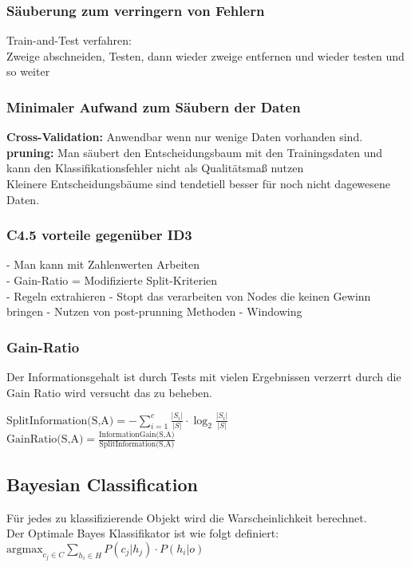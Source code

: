 \documentclass[a4paper]{scrartcl}
\begin{document}
\subsubsection{Säuberung zum verringern von Fehlern}
Train-and-Test verfahren:\\
 Zweige abschneiden, Testen, dann wieder zweige entfernen und wieder testen und so weiter\\
 
\subsubsection{Minimaler Aufwand zum Säubern der Daten}
\textbf{Cross-Validation:} Anwendbar wenn nur wenige Daten vorhanden sind. \\
\textbf{pruning:} Man säubert den Entscheidungsbaum mit den Trainingsdaten und kann den Klassifikationsfehler nicht als Qualitätsmaß nutzen\\

Kleinere Entscheidungsbäume sind tendetiell besser für noch nicht dagewesene Daten.\\

\subsubsection{C4.5 vorteile gegenüber ID3}
- Man kann mit Zahlenwerten Arbeiten\\
- Gain-Ratio = Modifizierte Split-Kriterien\\
- Regeln extrahieren
- Stopt das verarbeiten von Nodes die keinen Gewinn bringen
- Nutzen von post-prunning Methoden
- Windowing

\subsubsection{Gain-Ratio}
Der Informationsgehalt ist durch Tests mit vielen Ergebnissen verzerrt durch die Gain Ratio wird versucht das zu beheben.

$\text{SplitInformation(S,A)} = -\sum\limits^c_{i=1}\frac{|S_i|}{|S|}\cdot\log_2\frac{|S_i|}{|S|}$\\

$\text{GainRatio(S,A)}=\frac{\text{InformationGain(S,A)}}{\text{SplitInformation(S,A)}}$\\

\subsection{Bayesian Classification}
Für jedes zu klassifizierende Objekt wird die Warscheinlichkeit berechnet.\\
Der Optimale Bayes Klassifikator ist wie folgt definiert:\\
$\text{argmax}_{c_j\in C}\sum\limits_{h_i\in H}P(c_j|h_j)\cdot P(h_i|o)$\\
\end{document}
